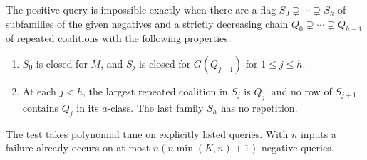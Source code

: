 \begin{theorem}
\label{core:thm:nested-repeated-guards}
The positive query is impossible exactly when there are a flag
$S_0\supsetneq\cdots\supsetneq S_h$ of subfamilies of the given
negatives and a strictly decreasing chain $Q_0\supsetneq\cdots
\supsetneq Q_{h-1}$ of repeated coalitions with the following properties.
\begin{enumerate}
\item $S_0$ is closed for $M$, and $S_j$ is closed for $G(Q_{j-1})$
for $1\le j\le h$.
\item At each $j<h$, the largest repeated coalition in $S_j$ is $Q_j$,
and no row of $S_{j+1}$ contains $Q_j$ in its $a$-class.
The last family $S_h$ has no repetition.
\end{enumerate}
The test takes polynomial time on explicitly listed queries. With $n$
inputs a failure already occurs on at most $n(n\min(K,n)+1)$ negative
queries.
\end{theorem}
